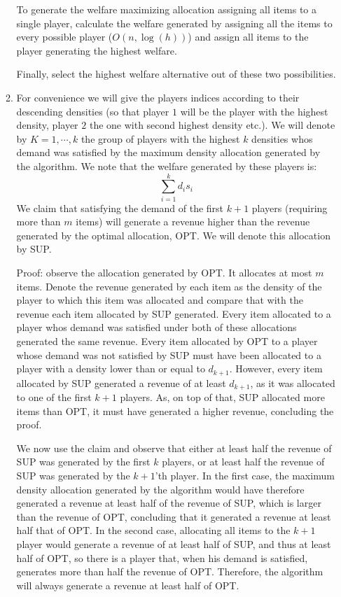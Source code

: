 \documentclass[a4page,notitlepage]{article}
\begin{document}
\begin{enumerate}
\begin{enumerate}
    To generate the welfare maximizing allocation assigning all items to a single player, calculate the welfare generated by assigning all the items to every possible player ($O(n,\log(h))$) and assign all items to the player generating the highest welfare.
    
    Finally, select the highest welfare alternative out of
    these two possibilities.
    \item
      For convenience we will give the players indices according to their descending densities (so that player $1$ will be the player with the highest density, player $2$ the one with second highest density etc.).
      We will denote by $K={1,\cdots,k}$ the group of players with the highest $k$ densities whos demand was satisfied by the maximum density allocation generated by the algorithm.
      We note that the welfare generated by these players is:
      \begin{equation*}
        \sum_{i=1}^kd_is_i
      \end{equation*}
      We claim that satisfying the demand of the first $k+1$ players (requiring more than $m$ items) will generate a revenue higher than the revenue generated by the optimal allocation, OPT.
      We will denote this allocation by SUP.

      Proof: observe the allocation generated by OPT.
      It allocates at most $m$ items.
      Denote the revenue generated by each item as the density of the player to which this item was allocated and compare that with the revenue each item allocated by SUP generated.
      Every item allocated to a player whos demand was satisfied under both of these allocations generated the same revenue.
      Every item allocated by OPT to a player whose demand was not satisfied by SUP must have been allocated to a player with a density lower than or equal to $d_{k+1}$.
      However, every item allocated by SUP generated a revenue of at least $d_{k+1}$, as it was allocated to one of the first $k+1$ players.
      As, on top of that, SUP allocated more items than OPT, it must have generated a higher revenue, concluding the proof.
      
      We now use the claim and observe that either at least half the revenue of SUP was generated by the first $k$ players, or at least half the revenue of SUP was generated by the $k+1$'th player.
      In the first case, the maximum density allocation generated by the algorithm would have therefore generated a revenue at least half of the revenue of SUP, which is larger than the revenue of OPT, concluding that it generated a revenue at least half that of OPT.
      In the second case, allocating all items to the $k+1$ player would generate a revenue of at least half of SUP, and thus at least half of OPT, so there is a player that, when his demand is satisfied, generates more than half the revenue of OPT.
      Therefore, the algorithm will always generate a revenue at least half of OPT.


\end{enumerate}
\end{enumerate}
\end{document}
